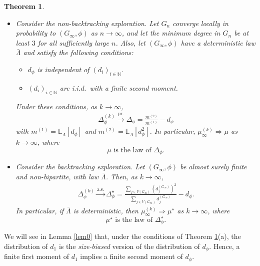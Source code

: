 \documentclass[11pt]{article}
\numberwithin{equation}{section}
\theoremstyle{plain}
\newtheorem{theorem}{Theorem}[section]
\newcommand{\N}{\mathbb N}
\newcommand{\prob}{\overset{\mathrm{pr.}}{\longrightarrow}}
\newcommand{\as}{\overset{\mathrm{a.s.}}{\longrightarrow}}
\newcommand{\weak}{\Longrightarrow}
\begin{document}
\begin{theorem}
\label{thm2}
$\mbox{}$
\begin{itemize}
\item[\rm{(a)}] 
Consider the non-backtracking exploration. 
Let $G_n$ converge locally in probability to $(G_\infty,\phi)$ as $n\to\infty$, and let the minimum degree in $G_n$ be at least $3$ for all sufficiently large $n$. Also, let
$(G_{\infty},\phi)$ have a deterministic law $\bar{\Lambda}$ and satisfy the following conditions:
\begin{itemize}
\item[{\rm (I)}] 
$d_{\phi}$ is independent of $(d_{i})_{i\in\N}$.
\item[{\rm (II)}] 
$(d_{i})_{i\in\N}$ are i.i.d.\ with a finite second moment.
\end{itemize}
Under these conditions, as $k\to\infty$,
\begin{align*}
\Delta_{\phi}^{(k)} \prob \Delta_{\phi} = \frac{m^{(2)}}{m^{(1)}}-d_{\phi}
\end{align*}
with $m^{(1)} = \mathbb{E}_{\bar{\Lambda}}[d_{\phi}]$ and $m^{(2)} = \mathbb{E}_{\bar{\Lambda}}[d_{\phi}^{2}]$. In particular, $\mu^{(k)}_{\infty} \weak \mu$ as $k\to\infty$, where 
\begin{equation}
\label{eq:mudef}
\mu \text{ is the law of } \Delta_{\phi}.
\end{equation}
\item[\rm{(b)}] 
Consider the backtracking exploration. Let $(G_{\infty},\phi)$ be almost surely finite and non-bipartite, with law $\bar{\Lambda}$. Then, as $k\to\infty$,
\begin{align*}
\Delta_{\phi}^{(k)} \as \Delta_{\phi}^{\star} = \frac{\sum_{j\in V(G_{\infty})}(d_{j}^{(G_{\infty})})^2}{\sum_{j\in V(G_{\infty})}d_{j}^{(G_{\infty})}}-d_{\phi}.
\end{align*}
In particular, if $\bar{\Lambda}$ is deterministic, then $\mu^{(k)}_{\infty} \weak \mu^{\star}$ as $k\to\infty$, where 
\begin{equation}
\label{eq:mustardef}
\mu^{\star} \text{ is the law of } \Delta_{\phi}^{\star}.
\end{equation}
\end{itemize}
\end{theorem}

We will see in Lemma \ref{lem0} that, under the conditions of Theorem \ref{thm2}(a), the distribution of $d_1$ is the \emph{size-biased} version of the distribution of $d_\phi$. Hence, a finite first moment of $d_1$ implies a finite second moment of $d_\phi$.
\end{document}
